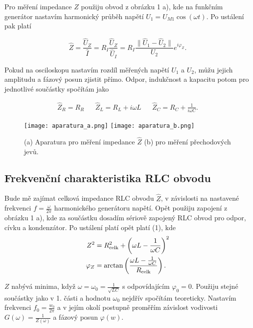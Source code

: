 \documentclass[a4paper,11pt]{article}
\begin{document}
Pro měření impedance $ \hat{Z} $ použiju obvod z obrázku 1 a), kde na funkčním generátor nastavím harmonický průběh napětí $ U_1 = U_{M1} \cos ( \omega t ) $. Po ustálení pak platí

\begin{equation}
    \hat{Z} = \frac{\hat{U}_Z}{\hat{I}} = R_I \frac{\hat{U}_Z}{\hat{U}_I} = R_I \frac{\| \hat{U}_1 - \hat{U}_2 \| }{U_2} e^{i \varphi_Z}.
\end{equation}

Pokud na osciloskopu nastavím rozdíl měřených napětí $ U_1 $ a $ U_2 $, můžu jejich amplitudu a fázový posun zjistit přímo. Odpor, indukčnost a kapacitu potom pro jednotlivé součástky spočítám jako 


\begin{align*}
    \hat{Z}_R = R_R && \hat{Z}_L = R_L + i \omega L  && \hat{Z}_C = R_C + \frac{1}{i \omega C} .
\end{align*}


\begin{figure}[htpb]
    \centering
    \texttt{[image: aparatura\_a.png]}
    \hfill
    \texttt{[image: aparatura\_b.png]}
    \caption{(a) Aparatura pro měření impedance $ \hat{Z} $ (b) pro měření přechodových jevů.}
\end{figure}

\subsection{Frekvenční charakteristika RLC obvodu}

Bude mě zajímat celková impedance RLC obvodu $ \hat{Z} $, v závislosti na nastavené frekvenci $ f = \frac{\omega}{2 \pi} $ harmonického generátoru napětí. Opět použiju zapojení z obrázku 1 a), kde za součástku dosadím sériově zapojený RLC obvod pro odpor, cívku a kondenzátor. Po ustálení platí opět platí (1), kde
\begin{align}
    Z^2 &= R_{\rm celk}^2 + \left(\omega L - \frac{1}{\omega C}\right)^2 \\
    \varphi_Z &= \arctan\left(\frac{ \omega L - \frac{1}{\omega C} }{R_{\rm celk}}\right).
\end{align}

$ Z $ nabývá minima, když $ \omega = \omega_0 = \frac{1}{\sqrt{LC} } $ s odpovídajícím $ \varphi_0 = 0 $. Použiju stejné součástky jako v 1. části a hodnotu $ \omega_0 $ nejdřív spočítám teoreticky. Nastavím frekvenci $ f_0 = \frac{w_0}{2 \pi} $ a v jejím okolí postupně proměřím závislost vodivosti $ G(\omega) = \frac{1}{Z(\omega)} $ a fázový posun $ \varphi(w) $.
\end{document}
